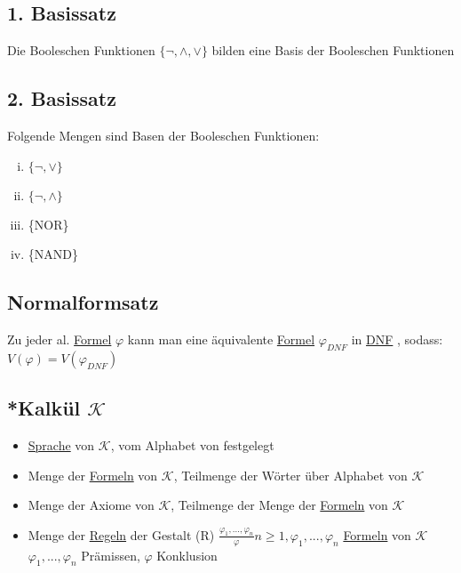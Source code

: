 \documentclass[12pt,a4paper]{article} %
\begin{document}
	\subsection{1. Basissatz}
	Die Booleschen Funktionen $\{\neg, \land, \lor\}$ bilden eine Basis der Booleschen Funktionen
	
	\subsection{2. Basissatz}
	Folgende Mengen sind Basen der Booleschen Funktionen: \newline
	\begin{enumerate}[(i)]
		\item $\{\neg, \lor\}$
		\item $\{\neg, \land\}$
		\item \{NOR\}
		\item \{NAND\}
	\end{enumerate}
	
	\subsection{Normalformsatz}
	Zu jeder al. \hyperref[Formel]{Formel} $\varphi$ kann man eine äquivalente \hyperref[Formel]{Formel} $\varphi_{DNF}$ in \hyperref[DNF]{DNF} , sodass: $V(\varphi) = V(\varphi_{DNF})$
	
	\subsection{*Kalkül $\mathcal{K}$}
	\label{Kalkul}
	\begin{itemize}
		\item \hyperref[Sprache]{Sprache} von $\mathcal{K}$, vom Alphabet von festgelegt 
		\item Menge der \hyperref[Formel]{Formeln} von $\mathcal{K}$, Teilmenge der Wörter über Alphabet von $\mathcal{K}$
		\item Menge der Axiome von $\mathcal{K}$, Teilmenge der Menge der \hyperref[Formel]{Formeln} von $\mathcal{K}$
		\item Menge der \hyperref[Kalkul]{Regeln} der Gestalt \newline
		(R) $\frac{\varphi_1, ..., \varphi_n}{\varphi} n \ge 1, \varphi_1, ..., \varphi_n$ \hyperref[Formel]{Formeln} von $\mathcal{K}$ \newline
		$\varphi_1, ..., \varphi_n$ Prämissen, $\varphi$ Konklusion
	\end{itemize}
\end{document}
